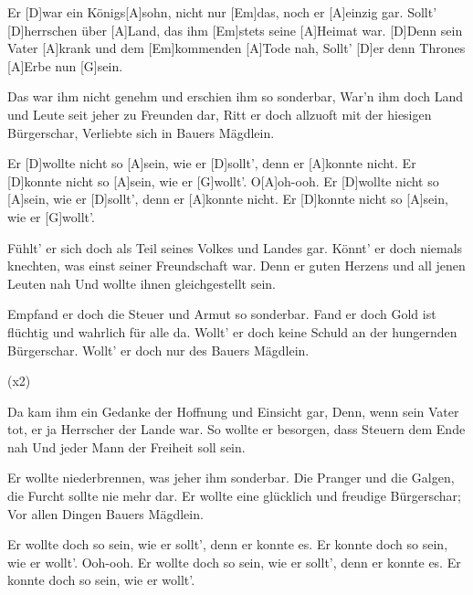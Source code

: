 

\begin{guitar}
	Er [D]war ein Königs[A]sohn, nicht nur [Em]das, noch er [A]einzig gar.
	Sollt' [D]herrschen über [A]Land, das ihm [Em]stets seine [A]Heimat war.
	[D]Denn sein Vater [A]krank und dem [Em]kommenden [A]Tode nah,
	Sollt' [D]er denn Thrones [A]Erbe nun [G]sein.
	
	Das war ihm nicht genehm und erschien ihm so sonderbar,
	War'n ihm doch Land und Leute seit jeher zu Freunden dar,
	Ritt er doch allzuoft mit der hiesigen Bürgerschar,
	Verliebte sich in Bauers Mägdlein.
	
	Er [D]wollte nicht so [A]sein, wie er [D]sollt', denn er [A]konnte nicht.
	Er [D]konnte nicht so [A]sein, wie er [G]wollt'. O[A]oh-ooh.
	Er [D]wollte nicht so [A]sein, wie er [D]sollt', denn er [A]konnte nicht.
	Er [D]konnte nicht so [A]sein, wie er [G]wollt'.
	
	Fühlt' er sich doch als Teil seines Volkes und Landes gar.
	Könnt' er doch niemals knechten, was einst seiner Freundschaft war.
	Denn er guten Herzens und all jenen Leuten nah
	Und wollte ihnen gleichgestellt sein.
	
	Empfand er doch die Steuer und Armut so sonderbar.
	Fand er doch Gold ist flüchtig und wahrlich für alle da.
	Wollt' er doch keine Schuld an der hungernden Bürgerschar.
	Wollt' er doch nur des Bauers Mägdlein.
	
	  (x2)
	
	\pagebreak
	
	Da kam ihm ein Gedanke der Hoffnung und Einsicht gar,
	Denn, wenn sein Vater tot, er ja Herrscher der Lande war.
	So wollte er besorgen, dass Steuern dem Ende nah
	Und jeder Mann der Freiheit soll sein.
	
	Er wollte niederbrennen, was jeher ihm sonderbar.
	Die Pranger und die Galgen, die Furcht sollte nie mehr dar.
	Er wollte eine glücklich und freudige Bürgerschar;
	Vor allen Dingen Bauers Mägdlein.
	
	Er wollte doch so sein, wie er sollt', denn er konnte es.
	Er konnte doch so sein, wie er wollt'. Ooh-ooh.
	Er wollte doch so sein, wie er sollt', denn er konnte es.
	Er konnte doch so sein, wie er wollt'.	
	

\end{guitar}
